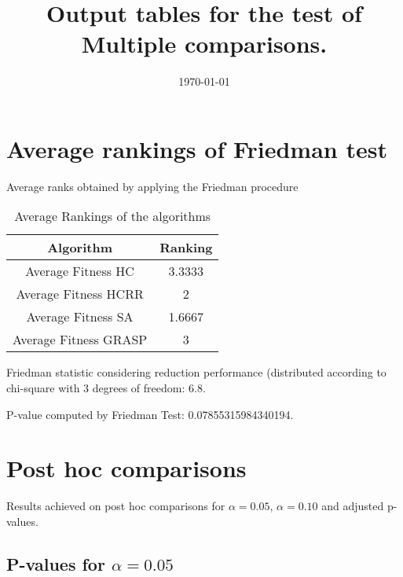 \documentclass[a4paper,10pt]{article}
\title{Output tables for the test of Multiple comparisons.}
\author{}
\date{\today}
\begin{document}
\begin{landscape}
\pagestyle{empty}
\maketitle
\thispagestyle{empty}
\section{Average rankings of Friedman test}



Average ranks obtained by applying the Friedman procedure

\begin{table}[!htp]
\centering
\begin{tabular}{|c|c|}\hline
Algorithm&Ranking\\\hline
Average Fitness HC     & 3.3333\\
Average Fitness HCRR    & 2\\
Average Fitness SA   & 1.6667\\
Average Fitness GRASP & 3\\
\hline
\end{tabular}
\caption{Average Rankings of the algorithms}
\end{table}

Friedman statistic considering reduction performance (distributed according to chi-square with 3 degrees of freedom: 6.8.

P-value computed by Friedman Test: 0.07855315984340194.\newline



\pagebreak

\section{Post hoc comparisons}

Results achieved on post hoc comparisons for $\alpha = 0.05$, $\alpha = 0.10$ and adjusted p-values.

\subsection{P-values for $\alpha=0.05$}


\end{landscape}
\end{document}
